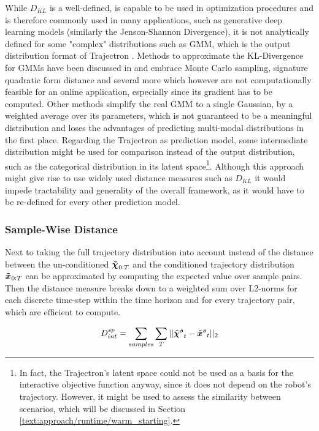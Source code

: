 While $D_{KL}$ is a well-defined, is capable to be used in optimization procedures and is therefore commonly used in many applications, such as generative deep learning models \cite{Goodfellow2014}\cite{Salzmann2020} (similarly the Jenson-Shannon Divergence), it is not analytically defined for some "complex" distributions such as \ac{GMM}, which is the output distribution format of Trajectron \cite{Ivanovic2018}. Methods to approximate the KL-Divergence for \ac{GMM}s have been discussed in \cite{Cui2015} and embrace Monte Carlo sampling, signature quadratic form distance \cite{Beecks2011} and several more which however are not computationally feasible for an online application, especially since its gradient has to be computed. Other methods simplify the real \ac{GMM} to a single Gaussian, by a weighted average over its parameters, which is not guaranteed to be a meaningful distribution and loses the advantages of predicting multi-modal distributions in the first place. 
\newline
Regarding the Trajectron \cite{Ivanovic2018} as prediction model, some intermediate distribution might be used for comparison instead of the output distribution, such as the categorical distribution in its latent space\footnote{In fact, the Trajectron's latent space could not be used as a basis for the interactive objective function anyway, since it does not depend on the robot's trajectory. However, it might be used to assess the similarity between scenarios, which will be discussed in Section \ref{text:approach/runtime/warm_starting}.}. Although this approach might give rise to use widely used distance measures such as $D_{KL}$ it would impede tractability and generality of the overall framework, as it would have to be re-defined for every other prediction model. 

\subsubsection{Sample-Wise Distance}
Next to taking the full trajectory distribution into account instead of the distance between the un-conditioned $\xpedwo[]_{0:T}$ and the conditioned trajectory distribution $\xped[]_{0:T}$ can be approximated by computing the expected value over sample pairs. Then the distance measure breaks down to a weighted sum over L2-norms for each discrete time-step within the time horizon and for every trajectory pair, which are efficient to compute. 

\begin{equation}
D_{int}^{sp} = \sum_{samples} \sum_T ||\xpedwo[s]_t - \xped[s]_t||_2
\end{equation}


